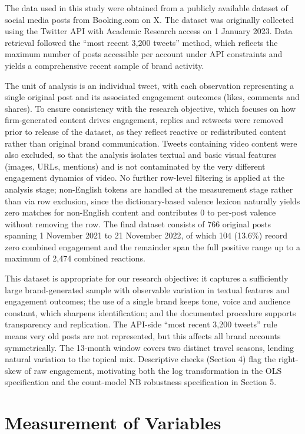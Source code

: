 \documentclass[12pt,a4paper]{article}
\begin{document}
The data used in this study were obtained from a publicly available dataset of social media posts from Booking.com on X. The dataset was originally collected using the Twitter API with Academic Research access on 1 January 2023. Data retrieval followed the ``most recent 3{,}200 tweets'' method, which reflects the maximum number of posts accessible per account under API constraints and yields a comprehensive recent sample of brand activity.

The unit of analysis is an individual tweet, with each observation representing a single original post and its associated engagement outcomes (likes, comments and shares). To ensure consistency with the research objective, which focuses on how firm-generated content drives engagement, replies and retweets were removed prior to release of the dataset, as they reflect reactive or redistributed content rather than original brand communication. Tweets containing video content were also excluded, so that the analysis isolates textual and basic visual features (images, URLs, mentions) and is not contaminated by the very different engagement dynamics of video. No further row-level filtering is applied at the analysis stage; non-English tokens are handled at the measurement stage rather than via row exclusion, since the dictionary-based valence lexicon naturally yields zero matches for non-English content and contributes 0 to per-post valence without removing the row. The final dataset consists of 766 original posts spanning 1 November 2021 to 21 November 2022, of which 104 (13.6\%) record zero combined engagement and the remainder span the full positive range up to a maximum of 2{,}474 combined reactions.

This dataset is appropriate for our research objective: it captures a sufficiently large brand-generated sample with observable variation in textual features and engagement outcomes; the use of a single brand keeps tone, voice and audience constant, which sharpens identification; and the documented procedure supports transparency and replication. The API-side ``most recent 3{,}200 tweets'' rule means very old posts are not represented, but this affects all brand accounts symmetrically. The 13-month window covers two distinct travel seasons, lending natural variation to the topical mix. Descriptive checks (Section 4) flag the right-skew of raw engagement, motivating both the log transformation in the OLS specification and the count-model NB robustness specification in Section 5.

\section{Measurement of Variables}
\end{document}
